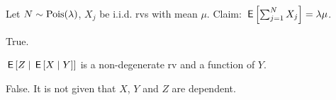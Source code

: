 \documentclass[tf-tutorial-all.tex]{subfiles}
\begin{document}
\begin{truefalse}
Let $N \sim \mathrm{Pois}(\lambda)$, $X_j$ be i.i.d. rvs with mean $\mu$. Claim: $\,\mathsf{E}\left[\sum_{j=1}^NX_j\right]=\lambda\mu$.

\begin{solution}
True.
\end{solution}
\end{truefalse}

\begin{truefalse}
$\,\mathsf{E}\left[Z \mid \,\mathsf{E}\left[X \mid Y\right]\right]$ is a non-degenerate rv and a function of $Y$.
\begin{solution}
False. It is not given that $X$, $Y$ and $Z$ are dependent. 
\end{solution}
\end{truefalse}
\end{document}
